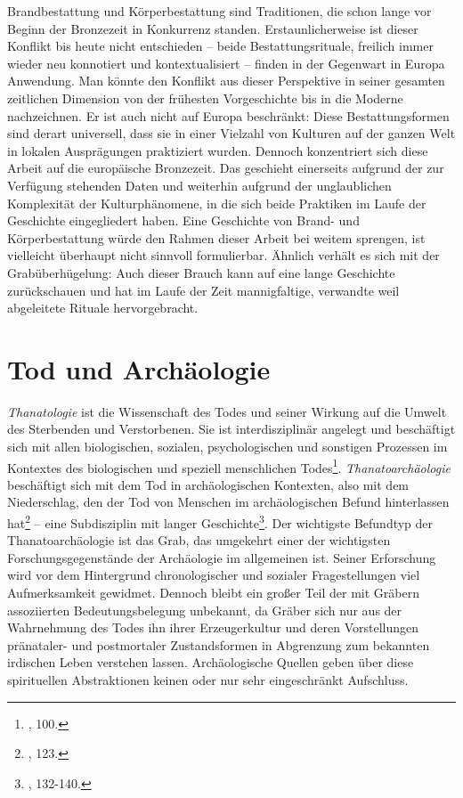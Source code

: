 \documentclass[openany,twoside,twocolumn]{book}
\let\rmarkdownfootnote\footnote%
\def\footnote{\protect\rmarkdownfootnote}
\begin{document}
Brandbestattung und Körperbestattung sind Traditionen, die schon lange
vor Beginn der Bronzezeit in Konkurrenz standen. Erstaunlicherweise ist
dieser Konflikt bis heute nicht entschieden -- beide Bestattungsrituale,
freilich immer wieder neu konnotiert und kontextualisiert -- finden in
der Gegenwart in Europa Anwendung. Man könnte den Konflikt aus dieser
Perspektive in seiner gesamten zeitlichen Dimension von der frühesten
Vorgeschichte bis in die Moderne nachzeichnen. Er ist auch nicht auf
Europa beschränkt: Diese Bestattungsformen sind derart universell, dass
sie in einer Vielzahl von Kulturen auf der ganzen Welt in lokalen
Ausprägungen praktiziert wurden. Dennoch konzentriert sich diese Arbeit
auf die europäische Bronzezeit. Das geschieht einerseits aufgrund der
zur Verfügung stehenden Daten und weiterhin aufgrund der unglaublichen
Komplexität der Kulturphänomene, in die sich beide Praktiken im Laufe
der Geschichte eingegliedert haben. Eine Geschichte von Brand- und
Körperbestattung würde den Rahmen dieser Arbeit bei weitem sprengen, ist
vielleicht überhaupt nicht sinnvoll formulierbar. Ähnlich verhält es
sich mit der Grabüberhügelung: Auch dieser Brauch kann auf eine lange
Geschichte zurückschauen und hat im Laufe der Zeit mannigfaltige,
verwandte weil abgeleitete Rituale hervorgebracht.

\hypertarget{tod-und-archaologie}{%
\section{Tod und Archäologie}\label{tod-und-archaologie}}

\emph{Thanatologie} ist die Wissenschaft des Todes und seiner Wirkung
auf die Umwelt des Sterbenden und Verstorbenen. Sie ist interdisziplinär
angelegt und beschäftigt sich mit allen biologischen, sozialen,
psychologischen und sonstigen Prozessen im Kontextes des biologischen
und speziell menschlichen Todes\footnote{\textcite{hofmann_rituelle_2008},
  100.}. \emph{Thanatoarchäologie} beschäftigt sich mit dem Tod in
archäologischen Kontexten, also mit dem Niederschlag, den der Tod von
Menschen im archäologischen Befund hinterlassen hat\footnote{\textcite{hofmann_rituelle_2008},
  123.} -- eine Subdisziplin mit langer Geschichte\footnote{\textcite{hofmann_rituelle_2008},
  132-140.}. Der wichtigste Befundtyp der Thanatoarchäologie ist das
Grab, das umgekehrt einer der wichtigsten Forschungsgegenstände der
Archäologie im allgemeinen ist. Seiner Erforschung wird vor dem
Hintergrund chronologischer und sozialer Fragestellungen viel
Aufmerksamkeit gewidmet. Dennoch bleibt ein großer Teil der mit Gräbern
assoziierten Bedeutungsbelegung unbekannt, da Gräber sich nur aus der
Wahrnehmung des Todes ihn ihrer Erzeugerkultur und deren Vorstellungen
pränataler- und postmortaler Zustandsformen in Abgrenzung zum bekannten
irdischen Leben verstehen lassen. Archäologische Quellen geben über
diese spirituellen Abstraktionen keinen oder nur sehr eingeschränkt
Aufschluss.
\end{document}
